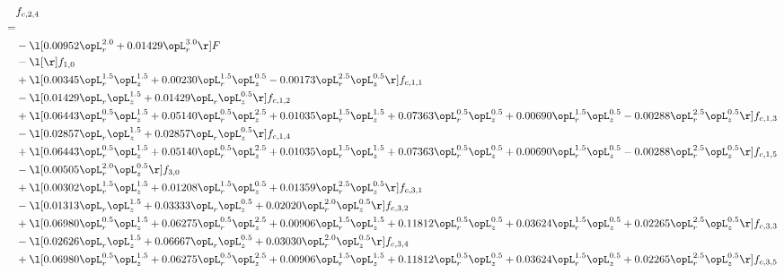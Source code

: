 \begin{alignat}{2} 
\label{eq:f_24_1} 
& f_{c,2,4} \nonumber \\ 
 = \\ 
& - \l[  0.00952 \opL_r^{2.0} +  0.01429 \opL_r^{3.0}  \r] F \nonumber \\ 
& - \l[  \r] f_{1,0} \nonumber \\ 
& + \l[  0.00345 \opL_r^{1.5} \opL_z^{1.5} +  0.00230 \opL_r^{1.5} \opL_z^{0.5}   -0.00173 \opL_r^{2.5} \opL_z^{0.5}  \r] f_{c,1,1} \nonumber \\ 
& - \l[  0.01429 \opL_r \opL_z^{1.5} +  0.01429 \opL_r \opL_z^{0.5}  \r] f_{c,1,2} \nonumber \\ 
& + \l[  0.06443 \opL_r^{0.5} \opL_z^{1.5} +  0.05140 \opL_r^{0.5} \opL_z^{2.5} +  0.01035 \opL_r^{1.5} \opL_z^{1.5} +  0.07363 \opL_r^{0.5} \opL_z^{0.5} +  0.00690 \opL_r^{1.5} \opL_z^{0.5}   -0.00288 \opL_r^{2.5} \opL_z^{0.5}  \r] f_{c,1,3} \nonumber \\ 
& - \l[  0.02857 \opL_r \opL_z^{1.5} +  0.02857 \opL_r \opL_z^{0.5}  \r] f_{c,1,4} \nonumber \\ 
& + \l[  0.06443 \opL_r^{0.5} \opL_z^{1.5} +  0.05140 \opL_r^{0.5} \opL_z^{2.5} +  0.01035 \opL_r^{1.5} \opL_z^{1.5} +  0.07363 \opL_r^{0.5} \opL_z^{0.5} +  0.00690 \opL_r^{1.5} \opL_z^{0.5}   -0.00288 \opL_r^{2.5} \opL_z^{0.5}  \r] f_{c,1,5} \nonumber \\ 
& - \l[  0.00505 \opL_r^{2.0} \opL_z^{0.5}  \r] f_{3,0} \nonumber \\ 
& + \l[  0.00302 \opL_r^{1.5} \opL_z^{1.5} +  0.01208 \opL_r^{1.5} \opL_z^{0.5} +  0.01359 \opL_r^{2.5} \opL_z^{0.5}  \r] f_{c,3,1} \nonumber \\ 
& - \l[  0.01313 \opL_r \opL_z^{1.5} +  0.03333 \opL_r \opL_z^{0.5} +  0.02020 \opL_r^{2.0} \opL_z^{0.5}  \r] f_{c,3,2} \nonumber \\ 
& + \l[  0.06980 \opL_r^{0.5} \opL_z^{1.5} +  0.06275 \opL_r^{0.5} \opL_z^{2.5} +  0.00906 \opL_r^{1.5} \opL_z^{1.5} +  0.11812 \opL_r^{0.5} \opL_z^{0.5} +  0.03624 \opL_r^{1.5} \opL_z^{0.5} +  0.02265 \opL_r^{2.5} \opL_z^{0.5}  \r] f_{c,3,3} \nonumber \\ 
& - \l[  0.02626 \opL_r \opL_z^{1.5} +  0.06667 \opL_r \opL_z^{0.5} +  0.03030 \opL_r^{2.0} \opL_z^{0.5}  \r] f_{c,3,4} \nonumber \\ 
& + \l[  0.06980 \opL_r^{0.5} \opL_z^{1.5} +  0.06275 \opL_r^{0.5} \opL_z^{2.5} +  0.00906 \opL_r^{1.5} \opL_z^{1.5} +  0.11812 \opL_r^{0.5} \opL_z^{0.5} +  0.03624 \opL_r^{1.5} \opL_z^{0.5} +  0.02265 \opL_r^{2.5} \opL_z^{0.5}  \r] f_{c,3,5} \nonumber \\ 

\end{alignat}
